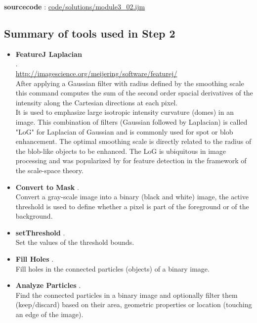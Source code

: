 \textbf{sourcecode} : \href{http://www.example.com/contents}{code/solutions/module3\_02.ijm}

\subsection{Summary of tools used in Step 2}
\label{summary_of_tools_mod_3_step_2}

\begin{itemize}

\item \textbf{FeatureJ Laplacian} \\
.\\
\url{http://imagescience.org/meijering/software/featurej/}\\
 After applying a Gaussian filter with radius defined by the smoothing scale this command computes the sum of the second order spacial derivatives of the intensity along the Cartesian directions at each pixel. \\
It is used to emphasize large isotropic intensity curvature (domes) in an image. This combination of filters (Gaussian followed by Laplacian) is called "LoG" for Laplacian of Gaussian and is commonly used for spot or blob enhancement. The optimal smoothing scale is directly related to the radius of the blob-like objects to be enhanced. The LoG is ubiquitous in image processing and was popularized by \cite{lindeberg1993scale} for feature detection in the framework of the scale-space theory.

\item \textbf{Convert to Mask} .\\
Convert a gray-scale image into a binary (black and white) image, the active threshold is used to define whether a pixel is part of the foreground or of the background.

\item \textbf{setThreshold} .\\
Set the values of the threshold bounds.

\item \textbf{Fill Holes} .\\
Fill holes in the connected particles (objects) of a binary image.

\item \textbf{Analyze Particles} .\\
Find the connected particles in a binary image and optionally filter them (keep/discard) based on their area, geometric properties or location (touching an edge of the image).


\end{itemize}
